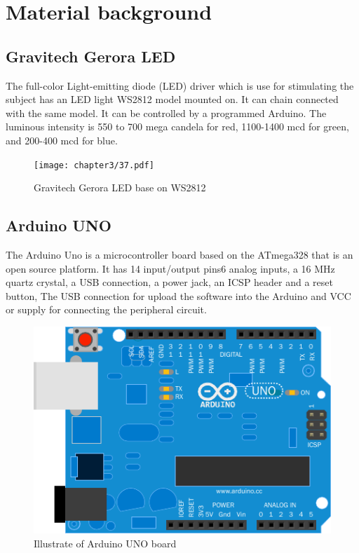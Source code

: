 \newpage
\section{Material background}

\subsection{Gravitech Gerora LED\cite{ref13}}

\hspace{1.5cm} The full-color Light-emitting diode (LED) driver which is use for stimulating the subject has an LED light WS2812 model mounted on. It can chain connected with the same model. It can be controlled by a programmed Arduino. The luminous intensity is 550 to 700 mega candela for red, 1100-1400 mcd for green, and 200-400 mcd for blue.
\begin{figure}[ht]
	\centering
	\texttt{[image: chapter3/37.pdf]}
	\caption{Gravitech Gerora LED base on WS2812}
\end{figure}

\subsection{Arduino UNO\cite{ref14}}

\hspace{1.5cm} The Arduino Uno is a microcontroller board based on the ATmega328 that is an open source platform. It has 14 input/output pins6 analog inputs, a 16 MHz quartz crystal, a USB connection, a power jack, an ICSP header and a reset button, The USB connection for upload the software into the Arduino and VCC or supply for connecting the peripheral circuit.   
\begin{figure}[ht]
	\centering
	\includegraphics[scale = 0.8]{chapter3/38.pdf}
	\caption{Illustrate of Arduino UNO board}
\end{figure}

